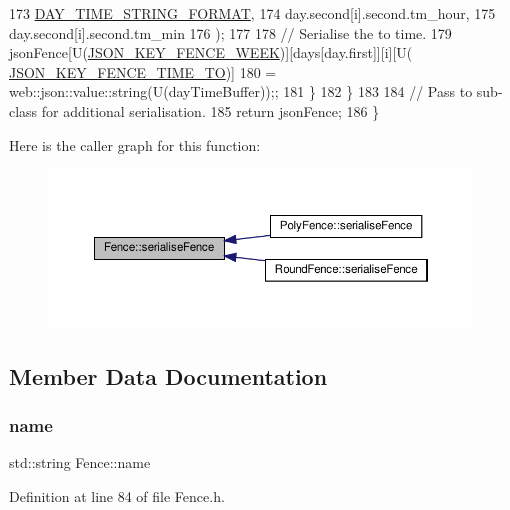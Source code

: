 \begin{DoxyCode}
173                      \hyperlink{_fence_8cpp_aa7662fb39f778fae608e70d079dc11ea}{DAY\_TIME\_STRING\_FORMAT},
174                      day.second[i].second.tm\_hour,
175                      day.second[i].second.tm\_min
176             );
177 
178             \textcolor{comment}{// Serialise the to time.}
179             jsonFence[U(\hyperlink{_fence_8h_a94c5efe13ae824c55eebaa9e8a76dd57}{JSON\_KEY\_FENCE\_WEEK})][days[day.first]][i][U(
      \hyperlink{_fence_8h_a5919ead6ef79432d59a9637a993cec9c}{JSON\_KEY\_FENCE\_TIME\_TO})]
180                     = web::json::value::string(U(dayTimeBuffer));;
181         \}
182     \}
183 
184     \textcolor{comment}{// Pass to sub-class for additional serialisation.}
185     \textcolor{keywordflow}{return} jsonFence;
186 \}
\end{DoxyCode}
Here is the caller graph for this function\+:\nopagebreak
\begin{figure}[H]
\begin{center}
\leavevmode
\includegraphics[width=350pt]{d0/db8/class_fence_a5c8529e80a4444cc9ca0fb660cbf07c8_icgraph}
\end{center}
\end{figure}


\subsection{Member Data Documentation}
\mbox{\label{class_fence_aa405676733f25812b38ea0dd9ccd1863}} 
\subsubsection{\texorpdfstring{name}{name}}
{\footnotesize\ttfamily std\+::string Fence\+::name\hspace{0.3cm}{\ttfamily [private]}}



Definition at line 84 of file Fence.\+h.

